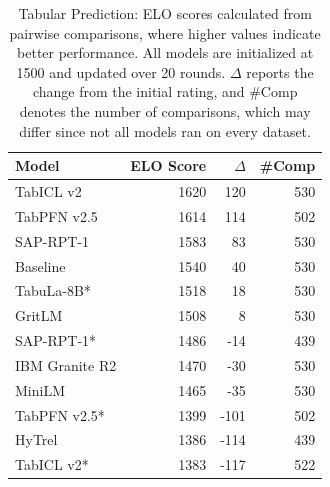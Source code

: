 \begin{table}[t]
\centering
\small
\setlength{\tabcolsep}{4pt}
\begin{tabular}{p{}rrr}
\toprule
Model & ELO Score & $\Delta$ & \#Comp \\
\midrule
TabICL v2 & 1620 & 120 & 530 \\
TabPFN v2.5 & 1614 & 114 & 502 \\
SAP-RPT-1 & 1583 & 83 & 530 \\
Baseline & 1540 & 40 & 530 \\
TabuLa-8B* & 1518 & 18 & 530 \\
GritLM & 1508 & 8 & 530 \\
SAP-RPT-1* & 1486 & -14 & 439 \\
IBM Granite R2 & 1470 & -30 & 530 \\
MiniLM & 1465 & -35 & 530 \\
TabPFN v2.5* & 1399 & -101 & 502 \\
HyTrel & 1386 & -114 & 439 \\
TabICL v2* & 1383 & -117 & 522 \\
\bottomrule
\end{tabular}
\caption{Tabular Prediction: ELO scores calculated from pairwise comparisons, where higher values indicate better performance. All models are initialized at 1500 and updated over 20 rounds. $\Delta$ reports the change from the initial rating, and \#Comp denotes the number of comparisons, which may differ since not all models ran on every dataset.}
\label{tab:tabular_prediction_elo}
\end{table}

